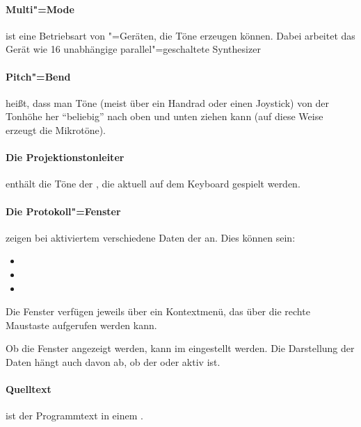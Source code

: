 \paragraph{Multi"=Mode}\label{sec:DV_MULTI} ist eine
  Betriebsart von "=Geräten, die Töne
  erzeugen können. Dabei arbeitet das Gerät wie 16 unabhängige
  parallel"=geschaltete Synthesizer

\paragraph{Pitch"=Bend}\label{sec:DV_PITCH} heißt, dass man Töne
  (meist über ein Handrad oder einen Joystick) von der Tonhöhe her
  "`beliebig"' nach oben und unten ziehen kann (auf diese Weise
  erzeugt \mutabor{} die Mikrotöne).

\paragraph{Die Projektionstonleiter}\label{sec:DV_PROJTONLEITER}
  enthält die Töne der
  , die aktuell auf dem
  Keyboard gespielt werden.

\paragraph{Die Protokoll"=Fenster}\label{sec:DV_PROTOKOLL} 
  zeigen bei aktiviertem 
  verschiedene Daten der  an. Dies können
  sein:
  \begin{itemize}
  \item {}
  \item {}
  \item {}
  \end{itemize}
  Die Fenster verfügen jeweils über ein Kontextmenü, das über die
  rechte Maustaste aufgerufen werden kann.

  Ob die Fenster angezeigt werden, kann im
   eingestellt werden. Die
  Darstellung der Daten hängt auch davon ab, ob der
   oder
   aktiv
  ist.

\paragraph{Quelltext}\label{sec:DV_QUELLTEXT} ist der
  Programmtext in einem .

